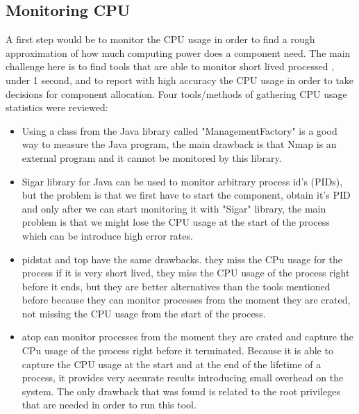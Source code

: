 \subsection{Monitoring CPU}
A first step would be to monitor the CPU usage in order to find a rough approximation of how much computing power does a component need. The main challenge here is to find tools that are able to monitor short lived processed , under 1 second, and to report with high accuracy the CPU usage in order to take decisions for component allocation. Four tools/methods of gathering CPU usage statistics were reviewed:  
\begin{itemize}
	\item Using a class from the Java library called "ManagementFactory" is a good way to measure the Java program, the main drawback is that Nmap is an external program and it cannot be monitored by this library.
	\item Sigar library for Java can be used to monitor arbitrary process id's (PIDs), but the problem is that we first have to start the component, obtain it's PID and only after we can start monitoring it with "Sigar" library, the main problem is that we might lose the CPU usage at the start of the process which can be introduce high error rates.
	\item pidstat and top have the same drawbacks. they miss the CPu usage for the process if it is very short lived, they miss the CPU usage of the process right before it ends, but they are better alternatives than the tools mentioned before because they can monitor processes from the moment they are crated, not missing the CPU usage from the start of the process.
	\item atop can monitor processes from the moment they are crated and capture the CPu usage of the process right before it terminated. Because it is able to capture the CPU usage at the start and at the end of the lifetime of a process, it provides very accurate results introducing small overhead on the system. The only drawback that was found is related to the root privileges that are needed in order to run this tool.
\end{itemize}
 
